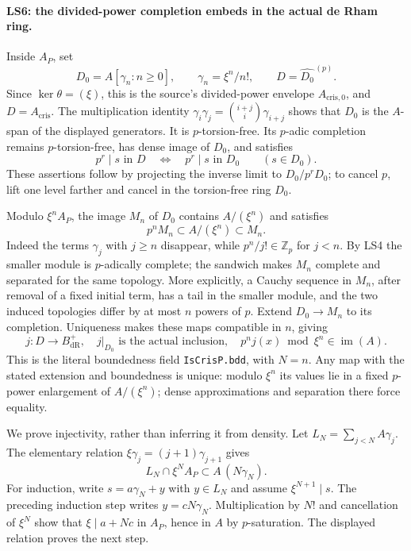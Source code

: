 \paragraph{LS6: the divided-power completion embeds in the actual de Rham ring.}
Inside $A_P$, set
\[
 D_0=A[\gamma_n:n\ge0],\qquad \gamma_n=\xi^n/n!,
 \qquad D=\widehat{D_0}^{\,(p)}.                    \tag{LS.14}
\]
Since $\ker\theta=(\xi)$, this is the source's divided-power
envelope $A_{\mathrm{cris},0}$, and $D=A_{\mathrm{cris}}$.
The multiplication identity
$\gamma_i\gamma_j=\binom{i+j}{i}\gamma_{i+j}$ shows that $D_0$
is the $A$-span of the displayed generators. It is $p$-torsion-free.
Its $p$-adic completion remains $p$-torsion-free, has dense image
of $D_0$, and satisfies
\[
 p^r\mid s\text{ in }D\quad\Longleftrightarrow\quad
 p^r\mid s\text{ in }D_0\qquad(s\in D_0).          \tag{LS.15}
\]
These assertions follow by projecting the inverse limit to
$D_0/p^rD_0$; to cancel $p$, lift one level farther and cancel in
the torsion-free ring $D_0$.

Modulo $\xi^nA_P$, the image $M_n$ of $D_0$ contains
$A/(\xi^n)$ and satisfies
\[
 p^n M_n\subset A/(\xi^n)\subset M_n.              \tag{LS.16}
\]
Indeed the terms $\gamma_j$ with $j\ge n$ disappear, while
$p^n/j!\in\mathbb Z_p$ for $j<n$. By LS4 the smaller module is
$p$-adically complete; the sandwich makes $M_n$ complete and
separated for the same topology. More explicitly, a Cauchy sequence
in $M_n$, after removal of a fixed initial term, has a tail in the
smaller module, and the two induced topologies differ by at most
$n$ powers of $p$. Extend $D_0\to M_n$ to its completion.
Uniqueness makes these maps compatible in $n$, giving
\[
 j:D\longrightarrow B_{\mathrm{dR}}^+,
 \quad j|_{D_0}\text{ is the actual inclusion},\quad
 p^n j(x)\bmod\xi^n\in\operatorname{im}(A).        \tag{LS.17}
\]
This is the literal boundedness field \texttt{IsCrisP.bdd}, with
$N=n$. Any map with the stated extension and boundedness is unique:
modulo $\xi^n$ its values lie in a fixed $p$-power enlargement of
$A/(\xi^n)$; dense approximations and separation there force equality.

We prove injectivity, rather than inferring it from density. Let
$L_N=\sum_{j<N}A\gamma_j$. The elementary relation
$\xi\gamma_j=(j+1)\gamma_{j+1}$ gives
\[
 L_N\cap\xi^N A_P\subset A\,(N\gamma_N).          \tag{LS.18}
\]
For induction, write $s=a\gamma_N+y$ with $y\in L_N$ and assume
$\xi^{N+1}\mid s$. The preceding induction step writes
$y=cN\gamma_N$. Multiplication by $N!$ and cancellation of
$\xi^N$ show that $\xi\mid a+Nc$ in $A_P$, hence in $A$ by
$p$-saturation. The displayed relation proves the next step.

